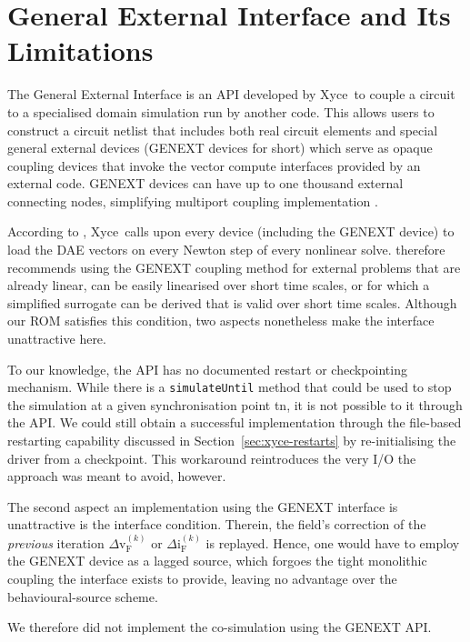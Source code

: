 \section{General External Interface and Its Limitations} \label{sec:xyce-genext}

The General External Interface is an API developed by Xyce\texttrademark \ to couple a circuit to a specialised domain simulation run by another code. This allows users to construct a circuit netlist that includes both real circuit elements and special general external devices (GENEXT devices for short) which serve as opaque coupling devices that invoke the vector compute interfaces provided by an external code. GENEXT devices can have up to one thousand external connecting nodes, simplifying multiport coupling implementation \cite{Russo2018GenExt}.

According to \cite{Russo2018GenExt}, Xyce\texttrademark \ calls upon every device (including the GENEXT device) to load the DAE vectors on every Newton step of every nonlinear solve. \cite{Russo2018GenExt} therefore recommends using the GENEXT coupling method for external problems that are already linear, can be easily linearised over short time scales, or for which a simplified surrogate can be derived that is valid over short time scales. Although our ROM satisfies this condition, two aspects nonetheless make the interface unattractive here.

To our knowledge, the API has no documented restart or checkpointing mechanism. While there is a \lstinline|simulateUntil| method that could be used to stop the simulation at a given synchronisation point \gls{tn}, it is not possible to  it through the API. We could still obtain a successful implementation through the file-based restarting capability discussed in Section~\ref{sec:xyce-restarts} by re-initialising the driver from a checkpoint. This workaround reintroduces the very I/O the approach was meant to avoid, however.

The second aspect an implementation using the GENEXT interface is unattractive is the interface condition. Therein, the field's correction of the \textit{previous} iteration $\Delta \mathrm{v}_{\text{F}}^{(k)}$ or $\Delta \mathrm{i}_{\text{F}}^{(k)}$ is replayed. Hence, one would have to employ the GENEXT device as a lagged source, which forgoes the tight monolithic coupling the interface exists to provide, leaving no advantage over the behavioural-source scheme.

We therefore did not implement the co-simulation using the GENEXT API.